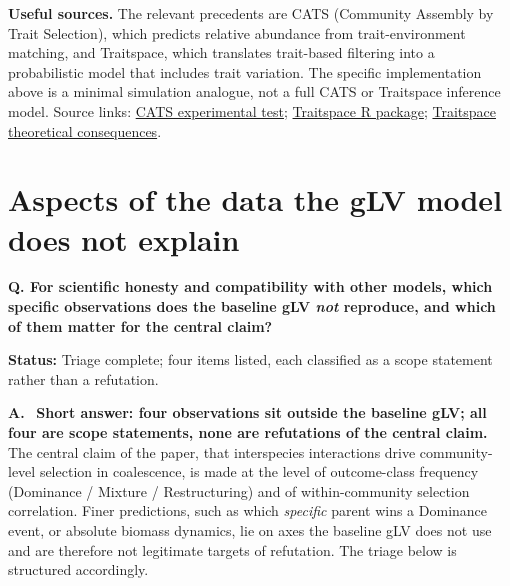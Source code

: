 \documentclass[11pt]{article}
\newcommand{\question}[1]{%
    \par\vspace{0.4em}\noindent%
    {\color{blue!70!black}\textbf{Q. #1}}\par\smallskip%
}
\newcommand{\answerlabel}{\par\noindent\textbf{A.}\ }
\newcommand{\statusmark}[1]{{\color{red!70!black}\textbf{Status:} #1}\par}
\begin{document}
\noindent\textbf{Useful sources.}
The relevant precedents are CATS (Community Assembly by Trait Selection), which predicts relative abundance from trait-environment matching, and Traitspace, which translates trait-based filtering into a probabilistic model that includes trait variation. The specific implementation above is a minimal simulation analogue, not a full CATS or Traitspace inference model. Source links: \href{https://journals.plos.org/plosone/article?id=10.1371/journal.pone.0206787}{CATS experimental test}; \href{https://rdrr.io/cran/Traitspace/}{Traitspace R package}; \href{https://researchcommons.waikato.ac.nz/entities/publication/28c56b7b-8a0c-4a4c-93ab-47dd3f1240ed}{Traitspace theoretical consequences}.

\section{Aspects of the data the gLV model does not explain}
\label{sec:q6_unexplained}

\question{For scientific honesty and compatibility with other models, which specific observations does the baseline gLV \emph{not} reproduce, and which of them matter for the central claim?}
\statusmark{Triage complete; four items listed, each classified as a scope statement rather than a refutation.}

\answerlabel
\textbf{Short answer: four observations sit outside the baseline gLV; all four are scope statements, none are refutations of the central claim.} The central claim of the paper, that interspecies interactions drive community-level selection in coalescence, is made at the level of outcome-class frequency (Dominance / Mixture / Restructuring) and of within-community selection correlation. Finer predictions, such as which \emph{specific} parent wins a Dominance event, or absolute biomass dynamics, lie on axes the baseline gLV does not use and are therefore not legitimate targets of refutation. The triage below is structured accordingly.
\end{document}
